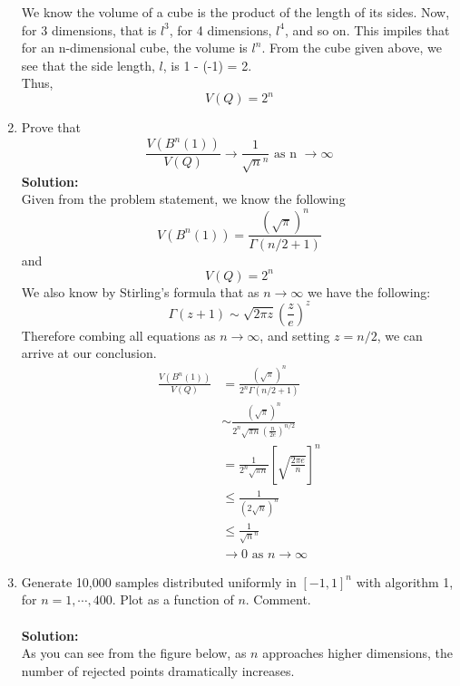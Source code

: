 \documentclass[11pt]{article}
\begin{document}
\begin{enumerate}
	We know the volume of a cube is the product of the length of its sides. Now, for 3 dimensions, that is $l^3$, for 4 dimensions, $l^4$, and so on. This impiles that for an n-dimensional cube, the volume is $l^n$.
	From the cube given above, we see that the side length, $l$, is 1 - (-1) = 2. \\
	Thus,
	\begin{equation*}
		\boxed{V(Q) = 2^n}
	\end{equation*}
	\item Prove that
	\begin{equation}
		\frac{V(B^n(1))}{V(Q)} \to \frac{1}{\sqrt{n}^n} \text{   as n   } \to \infty
	\end{equation}
	\textbf{Solution:} \\
	Given from the problem statement, we know the following
	\begin{equation*}
		V(B^n(1)) = \frac{(\sqrt{\pi})^n}{\Gamma(n/2 + 1)}
	\end{equation*}
	and
	\begin{equation*}
		V(Q) = 2^n
	\end{equation*}
	We also know by Stirling's formula that as $n \to \infty$ we have the following:
	\begin{equation*}
		\Gamma(z+1) \sim \sqrt{2\pi z}\left( \frac{z}{e}\right)^z
	\end{equation*}
	Therefore combing all equations as $n \to \infty$, and setting $z = n/2$, we can arrive at our conclusion.
	\begin{align*}
		\frac{V(B^n(1))}{V(Q)} &= \frac{\left( \sqrt{\pi} \right)^n}{2^n \Gamma(n/2 + 1)} \\
		&\sim \frac{\left(\sqrt{\pi}\right)^n}{2^n \sqrt{\pi n}\left( \frac{n}{2e}\right)^{n/2}} \\
		&= \frac{1}{2^n\sqrt{\pi n}}\left[\sqrt{\frac{2 \pi e}{n}}\right]^n \\
		&\le \frac{1}{(2\sqrt{n})^n} \\
		&\le \frac{1}{\sqrt{n}^n} \\
		&\to 0 \text{ as } n \to \infty
	\end{align*}
	\item Generate 10,000 samples distributed uniformly in $[-1,1]^n$ with algorithm 1, for $n = 1, \cdots, 400$. Plot as a function of $n$. Comment. \\\\
	\textbf{Solution:} \\
	As you can see from the figure below, as $n$ approaches higher dimensions, the number of rejected points dramatically increases. 

\end{enumerate}
\end{document}
